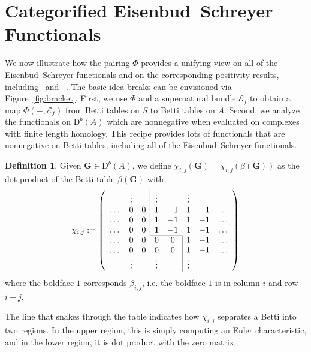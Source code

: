 \documentclass[12pt]{amsart}
\theoremstyle{definition}
\newtheorem{defn}[lemma]{Definition}
\theoremstyle{remark}
\newcommand{\cE}{\mathcal{E}}
\newcommand{\Gbull}{\mathbf{G}}
\newcommand{\DD}{\mathrm{D}}
\begin{document}
\section{Categorified Eisenbud--Schreyer Functionals}\label{sec:functionals}
We now illustrate how the pairing $\Phi$ provides a unifying view on all of the Eisenbud--Schreyer functionals and on the corresponding positivity results, including~\cite[Positivity 1]{eis-schrey-icm} and~ \cite[Positivity 2]{eis-schrey-icm}.  The basic idea breaks can be envisioned via Figure~\ref{fig:bracket}.  First, we use $\Phi$ and a supernatural bundle $\cE_f$ to obtain a map $\Phi(-,\cE_f)$ from Betti tables on $S$ to Betti tables on $A$.  Second, we analyze the functionals on $\DD^b(A)$ which are nonnegative when evaluated on complexes with finite length homology.  
This recipe provides lots of functionals that are nonnegative on Betti tables, including all of the Eisenbud--Schreyer functionals.

\begin{defn}\label{defn:chi}
Given $\Gbull\in \DD^b(A)$, we define $\chi_{i,j}(\Gbull)=\chi_{i,j}(\beta(\Gbull))$ as the dot product of the Betti table $\beta(\Gbull)$ with
\[
\chi_{i,j}:=
\left(
\begin{array}{cccccccc}
 & \vdots& &\multicolumn{1}{|c}{\vdots}&& \vdots&&\\
\dots&0&0&\multicolumn{1}{|c}{1}&-1&1&-1&\dots\\
\dots&0&0&\multicolumn{1}{|c}{1}&-1&1&-1&\dots\\
\dots&0&0&\multicolumn{1}{|c}{\mathbf{1}}&-1&1&-1&\dots\\ \cline{4-5}
\dots&0&0&0&0&\multicolumn{1}{|c}{1}&-1&\dots\\
\dots&0&0&0&0&\multicolumn{1}{|c}{1}&-1&\dots\\
& \vdots&&\vdots&& \multicolumn{1}{|c}{\vdots}&&\\
\end{array}
\right)
\]
where the boldface $1$ corresponds $\beta_{i,j}$, i.e. the boldface $1$ is in column $i$ and row $i-j$. 
\end{defn}
The line that snakes through
the table indicates how $\chi_{i,j}$ separates a Betti into two regions.  In the upper region, this is simply computing an Euler characteristic, and in the lower region, it is dot product with the zero matrix.
\end{document}
